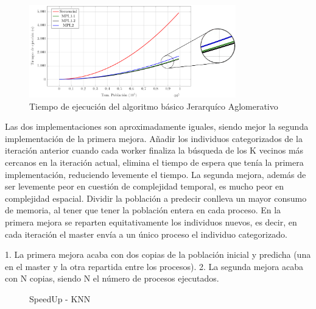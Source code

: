 \begin{figure}[!h]
	\centering
	\includegraphics[width=0.8\textwidth]{images/chapter_4/knn_mpi}
	\caption{Tiempo de ejecución del algoritmo básico Jerarquíco Aglomerativo}
	\label{fig:example}
\end{figure}

Las dos implementaciones son aproximadamente iguales, siendo mejor la segunda implementación de la primera mejora. Añadir los individuos categorizados de la iteración anterior cuando cada worker finaliza la búsqueda de los K vecinos más cercanos en la iteración actual, elimina el tiempo de espera que tenía la primera implementación, reduciendo levemente el tiempo.
La segunda mejora, además de ser levemente peor en cuestión de complejidad temporal, es mucho peor en complejidad espacial. Dividir la población a predecir conlleva un mayor consumo de memoria, al tener que tener la población entera en cada proceso. En la primera mejora se reparten equitativamente los individuos nuevos, es decir, en cada iteración el master envía a un único proceso el individuo categorizado.


1. La primera mejora acaba con dos copias de la población inicial y predicha (una en el master y la otra repartida entre los procesos). 
2. La segunda mejora acaba con N copias, siendo N el número de procesos ejecutados.


\vspace{0.1cm}

\begin{figure} [!h]
	\centering
	\caption{SpeedUp - KNN}
\end{figure}

